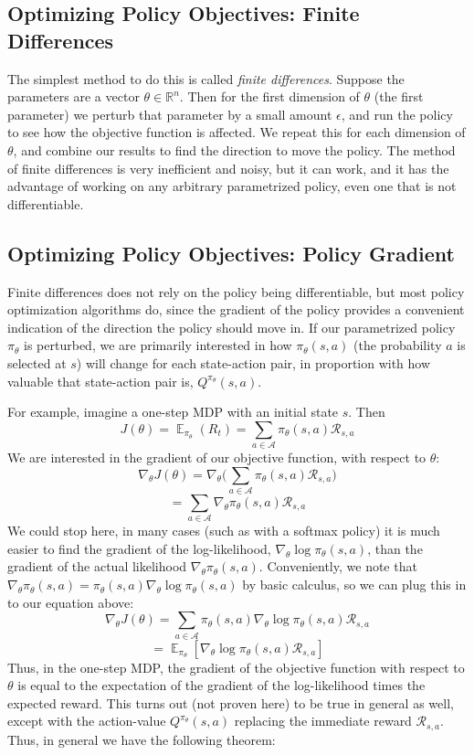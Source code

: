 \documentclass{article}
\DeclareMathOperator{\EX}{\mathbb{E}}
\newcommand{\ita}{\textit}
\newcommand{\eps}{\epsilon}
\newcommand{\R}{\mathbb{R}}
\begin{document}
\subsection{Optimizing Policy Objectives: Finite Differences}

The simplest method to do this is called \ita{finite differences}. Suppose the parameters are a vector $\theta\in\R^n$. Then for the first dimension of $\theta$ (the first parameter) we perturb that parameter by a small amount $\eps$, and run the policy to see how the objective function is affected. We repeat this for each dimension of $\theta$, and combine our results to find the direction to move the policy. The method of finite differences is very inefficient and noisy, but it can work, and it has the advantage of working on any arbitrary parametrized policy, even one that is not differentiable.

\subsection{Optimizing Policy Objectives: Policy Gradient}

Finite differences does not rely on the policy being differentiable, but most policy optimization algorithms do, since the gradient of the policy provides a convenient indication of the direction the policy should move in. If our parametrized policy $\pi_\theta$ is perturbed, we are primarily interested in how $\pi_\theta(s, a)$ (the probability $a$ is selected at $s$) will change for each state-action pair, in proportion with how valuable that state-action pair is, $Q^{\pi_\theta}(s, a)$.

For example, imagine a one-step MDP with an initial state $s$. Then
$$J(\theta) = \EX_{\pi_\theta}(R_t) = \sum_{a\in\mathcal{A}}\pi_\theta(s, a)\mathcal{R}_{s, a}$$
We are interested in the gradient of our objective function, with respect to $\theta$:
$$\nabla_\theta J(\theta) = \nabla_\theta\bigg(\sum_{a\in\mathcal{A}}\pi_\theta(s, a)\mathcal{R}_{s, a}\bigg)$$
$$=\sum_{a\in\mathcal{A}}\nabla_\theta\pi_\theta(s, a)\mathcal{R}_{s, a}$$
We could stop here, in many cases (such as with a softmax policy) it is much easier to find the gradient of the log-likelihood, $\nabla_\theta \log \pi_\theta(s, a)$, than the gradient of the actual likelihood $\nabla_\theta\pi_\theta(s, a)$. Conveniently, we note that $\nabla_\theta\pi_\theta(s, a) = \pi_\theta(s, a)\nabla_\theta \log \pi_\theta(s, a)$ by basic calculus, so we can plug this in to our equation above:
$$\nabla_\theta J(\theta) = \sum_{a\in\mathcal{A}}\pi_\theta(s, a)\nabla_\theta \log \pi_\theta(s, a)\mathcal{R}_{s, a}$$
$$=\EX_{\pi_\theta}[\nabla_\theta\log \pi_\theta(s, a)\mathcal{R}_{s, a}]$$
Thus, in the one-step MDP, the gradient of the objective function with respect to $\theta$ is equal to the expectation of the gradient of the log-likelihood times the expected reward. This turns out (not proven here) to be true in general as well, except with the action-value $Q^{\pi_\theta}(s, a)$ replacing the immediate reward $\mathcal{R}_{s, a}$. Thus, in general we have the following theorem:
\end{document}
